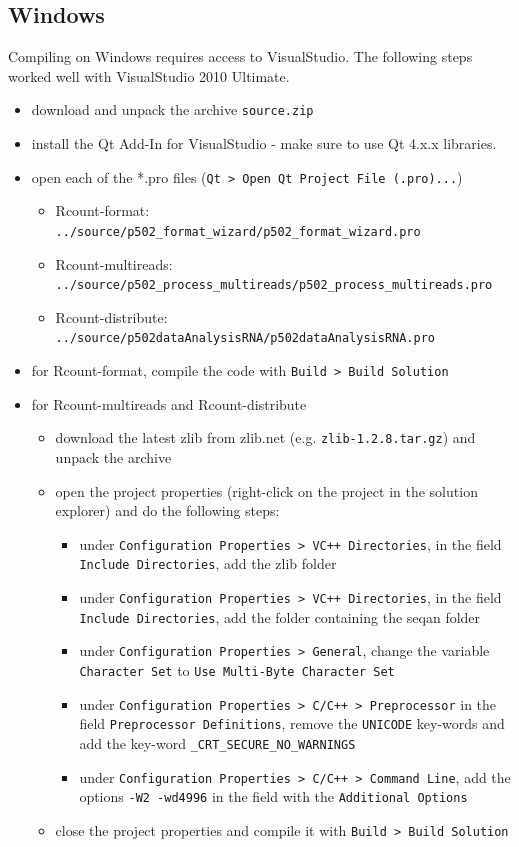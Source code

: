 \documentclass[a4paper,10pt]{article}
\begin{document}
\subsection{Windows}
Compiling on Windows requires access to VisualStudio. The following steps worked well with VisualStudio 2010 Ultimate.
\begin{itemize}
\item download and unpack the archive \texttt{source.zip}
\item install the Qt Add-In for VisualStudio - make sure to use Qt 4.x.x libraries.
\item open each of the *.pro files (\texttt{Qt > Open Qt Project File (.pro)...})
\begin{itemize}
\item Rcount-format: \texttt{../source/p502\_format\_wizard/p502\_format\_wizard.pro}
\item Rcount-multireads: \texttt{../source/p502\_process\_multireads/p502\_process\_multireads.pro}
\item Rcount-distribute: \texttt{../source/p502dataAnalysisRNA/p502dataAnalysisRNA.pro}
\end{itemize}
\item for Rcount-format, compile the code with \texttt{Build > Build Solution}
\item for Rcount-multireads and Rcount-distribute
\begin{itemize}
\item download the latest zlib from zlib.net (e.g. \texttt{zlib-1.2.8.tar.gz}) and unpack the archive
\item open the project properties (right-click on the project in the solution explorer) and do the following steps:
\begin{itemize}
\item under \texttt{Configuration Properties > VC++ Directories}, in the field \texttt{Include Directories}, add the zlib folder
\item under \texttt{Configuration Properties > VC++ Directories}, in the field \texttt{Include Directories}, add the folder containing the seqan folder
\item under \texttt{Configuration Properties > General}, change the variable \texttt{Character Set} to \texttt{Use Multi-Byte Character Set}
\item under \texttt{Configuration Properties > C/C++ > Preprocessor} in the field \texttt{Preprocessor Definitions}, remove the \texttt{UNICODE} key-words and add the key-word \texttt{\_CRT\_SECURE\_NO\_WARNINGS}
\item under \texttt{Configuration Properties > C/C++ > Command Line}, add the options \texttt{-W2 -wd4996} in the field with the \texttt{Additional Options}
\end{itemize}
\item close the project properties and compile it with \texttt{Build > Build Solution}
\end{itemize}
\end{itemize}
\end{document}
